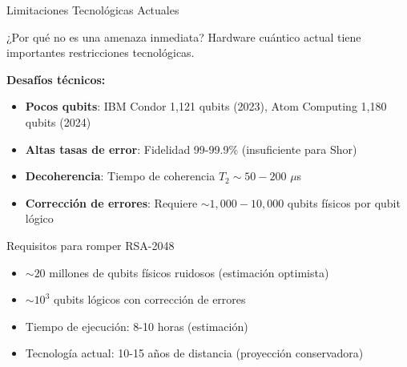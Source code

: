 \documentclass[aspectratio=169]{beamer}
\begin{document}

\begin{frame}{Limitaciones Tecnológicas Actuales}
\small
\begin{block}{¿Por qué no es una amenaza inmediata?}
Hardware cuántico actual tiene importantes restricciones tecnológicas.
\end{block}

\vspace{0.2cm}
\textbf{Desafíos técnicos:}
\begin{itemize}
\item \textbf{Pocos qubits}: IBM Condor 1,121 qubits (2023), Atom Computing 1,180 qubits (2024)
\item \textbf{Altas tasas de error}: Fidelidad 99-99.9\% (insuficiente para Shor)
\item \textbf{Decoherencia}: Tiempo de coherencia $T_2 \sim 50-200$ $\mu$s
\item \textbf{Corrección de errores}: Requiere $\sim 1,000-10,000$ qubits físicos por qubit lógico
\end{itemize}

\vspace{0.2cm}
\begin{exampleblock}{Requisitos para romper RSA-2048}
\begin{itemize}
\item $\sim 20$ millones de qubits físicos ruidosos (estimación optimista)
\item $\sim 10^3$ qubits lógicos con corrección de errores
\item Tiempo de ejecución: 8-10 horas (estimación)
\item Tecnología actual: 10-15 años de distancia (proyección conservadora)
\end{itemize}
\end{exampleblock}
\end{frame}
\end{document}

